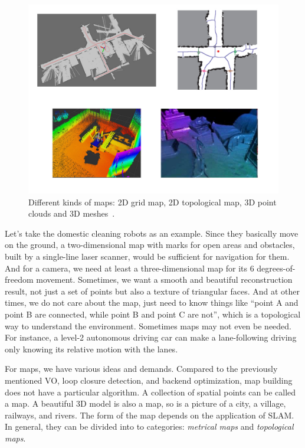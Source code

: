 \begin{figure}
	\centering
	\includegraphics[width=1.0\textwidth]{./resources/whatIsSLAM/map.pdf}
	\caption{Different kinds of maps: 2D grid map, 2D topological map, 3D point clouds and 3D meshes~\cite{Beeson2010}.}
	\label{fig:mapping}
\end{figure}

Let's take the domestic cleaning robots as an example. Since they basically move on the ground, a two-dimensional map with marks for open areas and obstacles, built by a single-line laser scanner, would be sufficient for navigation for them. And for a camera, we need at least a three-dimensional map for its 6 degrees-of-freedom movement. Sometimes, we want a smooth and beautiful reconstruction result, not just a set of points but also a texture of triangular faces. And at other times, we do not care about the map, just need to know things like ``point A and point B are connected, while point B and point C are not'', which is a topological way to understand the environment. Sometimes maps may not even be needed. For instance, a level-2 autonomous driving car can make a lane-following driving only knowing its relative motion with the lanes.

For maps, we have various ideas and demands. Compared to the previously mentioned VO, loop closure detection, and backend optimization, map building does not have a particular algorithm. A collection of spatial points can be called a map. A beautiful 3D model is also a map, so is a picture of a city, a village, railways, and rivers. The form of the map depends on the application of SLAM. In general, they can be divided into to categories: \emph{metrical maps} and \emph{topological maps}.

